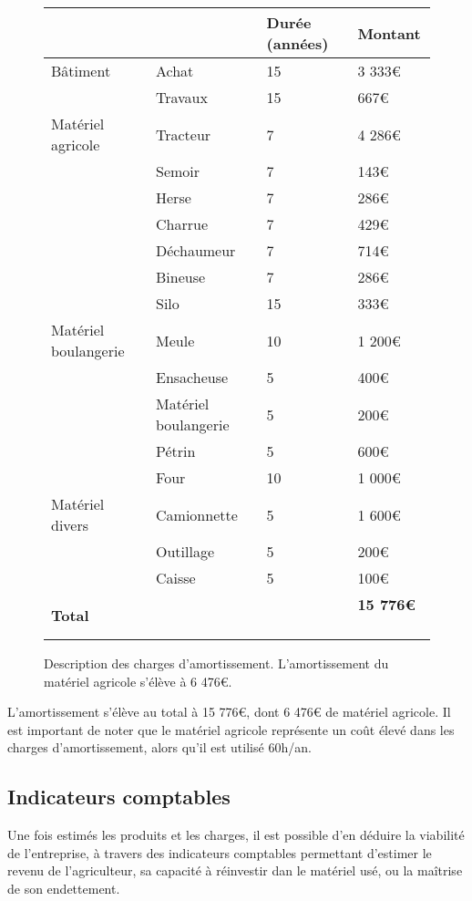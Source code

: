 \documentclass{book}
\begin{document}
\begin{figure}[h!]
\footnotesize
\center
\begin{tabular}{ | p{} | p{}| p{2cm}| p{2cm}| }
\hline
	& & Durée (années) & Montant\\\hline
	Bâtiment & Achat & 15 & 3 333\euro{} \\ 
	 & Travaux & 15 & 667\euro{} \\ \hline
	Matériel agricole & Tracteur & 7 & 4 286\euro{} \\
	 & Semoir & 7 & 143\euro{} \\
	 & Herse & 7 & 286\euro{} \\ 
	 & Charrue & 7 & 429\euro{} \\ 
	 & Déchaumeur & 7 & 714\euro{} \\
	 & Bineuse & 7 & 286\euro{} \\
	 & Silo & 15 & 333\euro{} \\ \hline
	Matériel boulangerie & Meule & 10 & 1 200\euro{} \\ 
	 & Ensacheuse & 5 & 400\euro{} \\ 
	 & Matériel boulangerie & 5 & 200\euro{} \\ 
	 & Pétrin & 5 & 600\euro{} \\ 
	 & Four & 10 & 1 000\euro{} \\ \hline
	Matériel divers & Camionnette & 5 & 1 600\euro{} \\ 
	 & Outillage & 5 & 200\euro{} \\ 
	 & Caisse & 5 & 100\euro{} \\ \hline
	 \hline
	\textbf{Total} &  & & \textbf{15 776\euro{}} \  \\ \hline
\end{tabular}
\caption{Description des charges d'amortissement. L'amortissement du matériel agricole s'élève à 6 476\euro{}.}
\label{tab:amortissement}
\end{figure}

L'amortissement s'élève au total à 15 776\euro{}, dont 6 476\euro{} de matériel agricole. Il est important de noter que le matériel agricole représente un coût élevé dans les charges d'amortissement, alors qu'il est utilisé 60h/an.

\subsection{Indicateurs comptables}

Une fois estimés les produits et les charges, il est possible d'en déduire la viabilité de l'entreprise, à travers des indicateurs comptables permettant d'estimer le revenu de l'agriculteur, sa capacité à réinvestir dan le matériel usé, ou la maîtrise de son endettement. 
\end{document}

